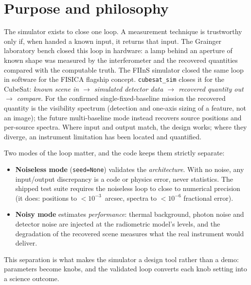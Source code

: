 \documentclass[11pt]{article}
\newcommand{\code}[1]{\texttt{\small #1}}
\begin{document}
\tableofcontents
\vspace{0.6em}
\noindent{\color{plumrule}\rule{\textwidth}{0.6pt}}
\vspace{0.4em}

\section{Purpose and philosophy}

The simulator exists to close one loop. A measurement technique is
trustworthy only if, when handed a known input, it returns that input. The
Grainger laboratory bench closed this loop in hardware: a lamp behind an
aperture of known shape was measured by the interferometer and the recovered
quantities compared with the computable truth. The FIInS simulator closed the
same loop in software for the FISICA flagship concept. \code{cubesat\_sim}
closes it for the CubeSat: \emph{known scene in $\rightarrow$ simulated
detector data $\rightarrow$ recovered quantity out $\rightarrow$ compare}. For
the confirmed single-fixed-baseline mission the recovered quantity is the
visibility spectrum (detection and one-axis sizing of a feature, not an
image); the future multi-baseline mode instead recovers source positions and
per-source spectra. Where input and output match, the design works; where
they diverge, an instrument limitation has been located and quantified.

Two modes of the loop matter, and the code keeps them strictly separate:

\begin{itemize}
\item \textbf{Noiseless mode} (\code{seed=None}) validates the
\emph{architecture}. With no noise, any input/output discrepancy is a code or
physics error, never statistics. The shipped test suite requires the noiseless
loop to close to numerical precision (it does: positions to
$<10^{-3}$~arcsec, spectra to $<10^{-6}$ fractional error).
\item \textbf{Noisy mode} estimates \emph{performance}: thermal background,
photon noise and detector noise are injected at the radiometric model's
levels, and the degradation of the recovered scene measures what the real
instrument would deliver.
\end{itemize}

This separation is what makes the simulator a design tool rather than a demo:
parameters become knobs, and the validated loop converts each knob setting
into a science outcome.
\end{document}
